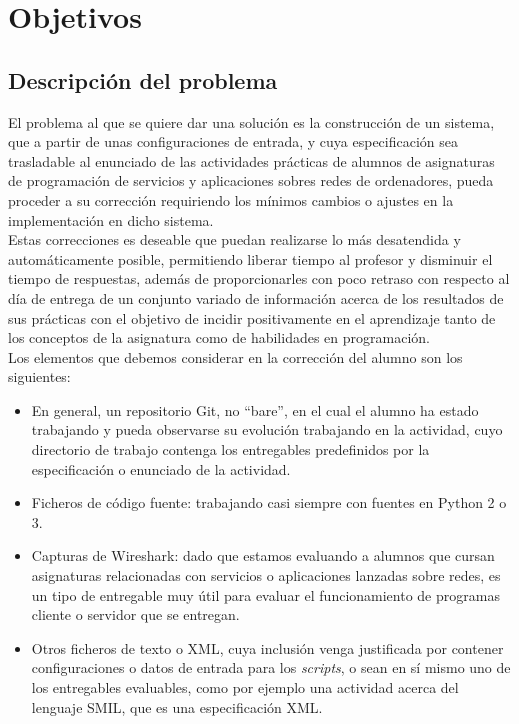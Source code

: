 \cleardoublepage
\chapter{Objetivos}
\label{chap:objetivos}


\section{Descripción del problema}
\label{sec:des_problema}


El problema al que se quiere dar una solución es la construcción de un sistema, que a partir de unas configuraciones de entrada, y cuya especificación sea trasladable al enunciado de las actividades prácticas de alumnos de asignaturas de programación de servicios y aplicaciones sobres redes de ordenadores, pueda proceder a su corrección requiriendo los mínimos cambios o ajustes en la implementación en dicho sistema.\\


Estas correcciones es deseable que puedan realizarse lo más desatendida y automáticamente posible, permitiendo liberar tiempo al profesor y disminuir el tiempo de respuestas, además de proporcionarles con poco retraso con respecto al día de entrega de un conjunto variado de información acerca de los resultados de sus prácticas con el objetivo de incidir positivamente en el aprendizaje tanto de los conceptos de la asignatura como de habilidades en programación.\\


Los elementos que debemos considerar en la corrección del alumno son los siguientes:\\

\begin{itemize}
\item En general, un repositorio Git, no ``bare'', en el cual el alumno ha estado trabajando y pueda observarse su evolución trabajando en la actividad, cuyo directorio de trabajo contenga los entregables predefinidos por la especificación o enunciado de la actividad.\\

\item Ficheros de código fuente: trabajando casi siempre con fuentes en Python 2 o 3.\\

\item Capturas de Wireshark: dado que estamos evaluando a alumnos que cursan asignaturas relacionadas con servicios o aplicaciones lanzadas sobre redes, es un tipo de entregable muy útil para evaluar el funcionamiento de programas cliente o servidor que se entregan.\\

\item Otros ficheros de texto o XML, cuya inclusión venga justificada por contener configuraciones o datos de entrada para los \textit{scripts}, o sean en sí mismo uno de los entregables evaluables, como por ejemplo una actividad acerca del lenguaje SMIL, que es una especificación XML.\\
\end{itemize}


